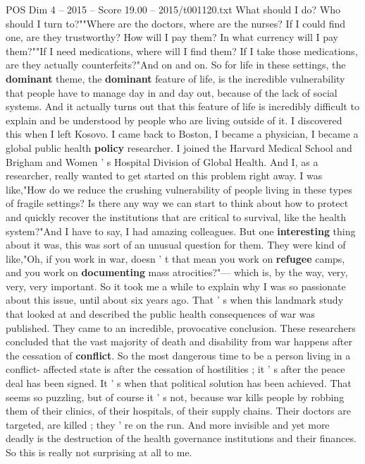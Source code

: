 \begin{textsample}{POS Dim 4 – 2015 – Score 19.00 – 2015/t001120.txt}
What should I do?
Who should I turn to?""Where are the doctors, where are the nurses?
If I could find one, are they trustworthy?
How will I pay them?
In what currency will I pay them?""If I need medications, where will I find them?
If I take those medications, are they actually counterfeits?"And on and on.
So for life in these settings, the \textbf{dominant} theme, the \textbf{dominant} feature of life, is the incredible vulnerability that people have to manage day in and day out, because of the lack of social systems.
And it actually turns out that this feature of life is incredibly difficult to explain and be understood by people who are living outside of it.
I discovered this when I left Kosovo.
I came back to Boston, I became a physician, I became a global public health \textbf{policy} researcher.
I joined the Harvard Medical School and Brigham and Women ' s Hospital Division of Global Health.
And I, as a researcher, really wanted to get started on this problem right away.
I was like,"How do we reduce the crushing vulnerability of people living in these types of fragile settings?
Is there any way we can start to think about how to protect and quickly recover the institutions that are critical to survival, like the health system?"And I have to say, I had amazing colleagues.
But one \textbf{interesting} thing about it was, this was sort of an unusual question for them.
They were kind of like,"Oh, if you work in war, doesn ' t that mean you work on \textbf{refugee} camps, and you work on \textbf{documenting} mass atrocities?"— which is, by the way, very, very, very important.
So it took me a while to explain why I was so passionate about this issue, until about six years ago.
That ' s when this landmark study that looked at and described the public health consequences of war was published.
They came to an incredible, provocative conclusion.
These researchers concluded that the vast majority of death and disability from war happens after the cessation of \textbf{conflict}.
So the most dangerous time to be a person living in a conflict- affected state is after the cessation of hostilities ; it ' s after the peace deal has been signed.
It ' s when that political solution has been achieved.
That seems so puzzling, but of course it ' s not, because war kills people by robbing them of their clinics, of their hospitals, of their supply chains.
Their doctors are targeted, are killed ; they ' re on the run.
And more invisible and yet more deadly is the destruction of the health governance institutions and their finances.
So this is really not surprising at all to me.

\end{textsample}
